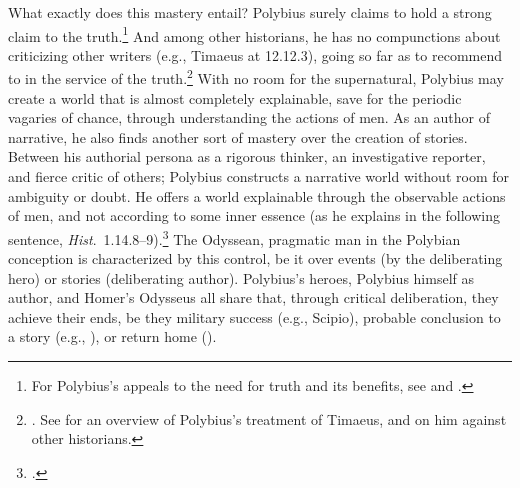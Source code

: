 \documentclass[12pt,letterpaper,oneside,final]{memoir}
\begin{document}
What exactly does this mastery entail? Polybius surely claims to hold a strong claim to the truth.\footnote{For Polybius's appeals to the need for truth and its benefits, see \textcite[pp.~139--144, esp.~ p.~139, n.~38 for examples]{sacks1981} and \textcite[p.~66 for other examples]{walbank1957}.} And among other historians, he has no compunctions about criticizing other writers (e.g., Timaeus at 12.12.3), going so far as to recommend to  in the service of the truth.\footnote{. See \textcite[21--95 \emph{passim}]{sacks1981} for an overview of Polybius's treatment of Timaeus, and \textcite[214--216]{pedech1964} on him against other historians.} With no room for the supernatural, Polybius may create a world that is almost completely explainable, save for the periodic vagaries of chance, through understanding the actions of men. As an author of narrative, he also finds another sort of mastery over the creation of stories. Between his authorial persona as a rigorous thinker, an investigative reporter, and fierce critic of others; Polybius constructs a narrative world without room for ambiguity or doubt. He offers a world explainable through the observable actions of men, and not according to some inner essence (as he explains in the following sentence, \emph{Hist}.~1.14.8--9).\footnote{.} The Odyssean, pragmatic man in the Polybian conception is characterized by this control, be it over events (by the deliberating hero) or stories (deliberating author). Polybius's heroes, Polybius himself as author, and Homer's Odysseus all share that, through critical deliberation, they achieve their ends, be they military success (e.g., Scipio), probable conclusion to a story (e.g., ), or return home ().
\end{document}
